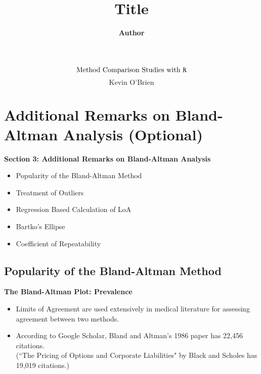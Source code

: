 \documentclass[compress]{beamer}        %
\title
{
{\huge Title\\[0.3cm] }
}
\author[Kevin O'Brien]{{\bf Author}}
\institute[University of Limerick, Maths \& Stats Dept]{}
\date{}
\makeatletter
\newcommand{\tcb}{\textcolor{beamer@blendedblue}}
\makeatother
\begin{document}
\begin{frame}
\huge
\[ \mbox{Method Comparison Studies with \texttt{R}} \]
\Large
\[ \mbox{Kevin O'Brien} \]
\end{frame}
\begin{frame}
\setcounter{tocdepth}{1}
\tableofcontents
\end{frame}

\section{Additional Remarks on Bland-Altman Analysis (Optional)}
\begin{frame}
\textbf{Section 3: Additional Remarks on Bland-Altman Analysis}
\begin{itemize}
\item Popularity of the Bland-Altman Method
\item Treatment of Outliers
\item Regression Based Calculation of LoA
\item Bartko's Ellipse
\item Coefficient of Repeatability
\end{itemize}
\end{frame}
\subsection{Popularity of the Bland-Altman Method}

\begin{frame}{\bf \tcb{The Bland-Altman Plot: Prevalence}}
\begin{itemize}\itemsep0.7cm

\item Limits of Agreement are used extensively in medical literature for assessing agreement between two methods.
\item According to Google Scholar, Bland and Altman's 1986 paper has 22,456 citations. \\(``The Pricing of Options and Corporate Liabilities" by Black and Scholes has 19,019 citations.)
\end{itemize}
\end{frame}
\end{document}
